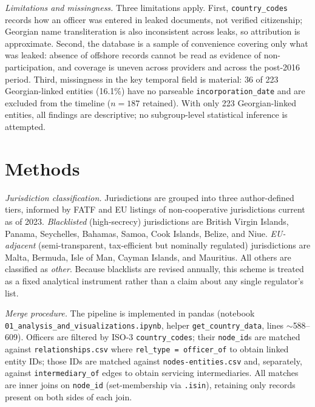 \documentclass[9pt,twoside]{pnas-new}
\begin{document}
\textit{Limitations and missingness.} Three limitations apply. First, \texttt{country\_codes} records how an officer was entered in leaked documents, not verified citizenship; Georgian name transliteration is also inconsistent across leaks, so attribution is approximate. Second, the database is a sample of convenience covering only what was leaked: absence of offshore records cannot be read as evidence of non-participation, and coverage is uneven across providers and across the post-2016 period. Third, missingness in the key temporal field is material: 36 of 223 Georgian-linked entities (16.1\%) have no parseable \texttt{incorporation\_date} and are excluded from the timeline ($n=187$ retained). With only 223 Georgian-linked entities, all findings are descriptive; no subgroup-level statistical inference is attempted.

\section*{Methods}

\textit{Jurisdiction classification.} Jurisdictions are grouped into three author-defined tiers, informed by FATF and EU listings of non-cooperative jurisdictions current as of 2023. \textit{Blacklisted} (high-secrecy) jurisdictions are British Virgin Islands, Panama, Seychelles, Bahamas, Samoa, Cook Islands, Belize, and Niue. \textit{EU-adjacent} (semi-transparent, tax-efficient but nominally regulated) jurisdictions are Malta, Bermuda, Isle of Man, Cayman Islands, and Mauritius. All others are classified as \textit{other}. Because blacklists are revised annually, this scheme is treated as a fixed analytical instrument rather than a claim about any single regulator's list.

\textit{Merge procedure.} The pipeline is implemented in pandas (notebook \texttt{01\_analysis\_and\_visualizations.ipynb}, helper \texttt{get\_country\_data}, lines $\sim$588--609). Officers are filtered by ISO-3 \texttt{country\_codes}; their \texttt{node\_id}s are matched against \texttt{relationships.csv} where \texttt{rel\_type = officer\_of} to obtain linked entity IDs; those IDs are matched against \texttt{nodes-entities.csv} and, separately, against \texttt{intermediary\_of} edges to obtain servicing intermediaries. All matches are inner joins on \texttt{node\_id} (set-membership via \texttt{.isin}), retaining only records present on both sides of each join.
\end{document}
